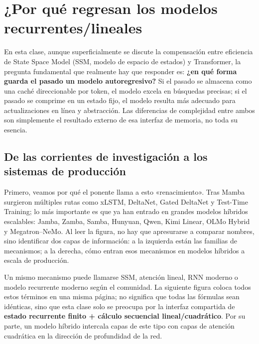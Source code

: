 \section{¿Por qué regresan los modelos recurrentes/lineales}

En esta clase, aunque superficialmente se discute la compensación entre eficiencia de State Space Model (SSM, modelo de espacio de estados) y Transformer, la pregunta fundamental que realmente hay que responder es: \textbf{¿en qué forma guarda el pasado un modelo autoregresivo?} Si el pasado se almacena como una caché direccionable por token, el modelo excela en búsquedas precisas; si el pasado se comprime en un estado fijo, el modelo resulta más adecuado para actualizaciones en línea y abstracción. Las diferencias de complejidad entre ambos son simplemente el resultado externo de esa interfaz de memoria, no toda su esencia.

\subsection{De las corrientes de investigación a los sistemas de producción}

Primero, veamos por qué el ponente llama a esto «renacimiento». Tras Mamba surgieron múltiples rutas como xLSTM, DeltaNet, Gated DeltaNet y Test-Time Training; lo más importante es que ya han entrado en grandes modelos híbridos escalables: Jamba, Zamba, Samba, Hunyuan, Qwen, Kimi Linear, OLMo Hybrid y Megatron--NeMo. Al leer la figura, no hay que apresurarse a comparar nombres, sino identificar dos capas de información: a la izquierda están las familias de mecanismos; a la derecha, cómo entran esos mecanismos en modelos híbridos a escala de producción.



Un mismo mecanismo puede llamarse SSM, atención lineal, RNN moderno o modelo recurrente moderno según el comunidad. La siguiente figura coloca todos estos términos en una misma página; no significa que todas las fórmulas sean idénticas, sino que esta clase solo se preocupa por la interfaz compartida de \textbf{estado recurrente finito + cálculo secuencial lineal/cuadrático}. Por su parte, un modelo híbrido intercala capas de este tipo con capas de atención cuadrática en la dirección de profundidad de la red.

